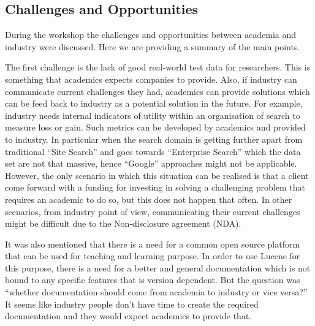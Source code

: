 \subsection{Challenges and Opportunities}


During the workshop the challenges and opportunities between academia and industry were discussed. 
Here we are providing a summary of the main points.


The first challenge is the lack of good real-world test data for researchers. This is something that academics expects companies to provide. 
Also, if industry can communicate current challenges they had, academics can provide solutions which can be feed back to industry as a potential solution in the future. 
For example, industry needs internal indicators of utility within an organisation of search to measure loss or gain. 
Such metrics can be developed by academics and provided to industry. 
In particular when the search domain is getting further apart from traditional ``Site Search'' and goes towards ``Enterprise Search'' which the data set are not that massive, hence ``Google'' approaches might not be applicable. 
However, the only scenario in which this situation can be realised is that a client come forward with a funding for investing in solving a challenging problem that requires an academic to do so, but this does not happen that often. 
In other scenarios, from industry point of view, communicating their current challenges might be difficult due to the Non-disclosure agreement (NDA).


It was also mentioned that there is a need for a common open source platform that can be used for teaching and learning purpose. 
In order to use Lucene for this purpose, there is a need for a better and general documentation which is not bound to any specific features that is version dependent. 
But the question was ``whether documentation should come from academia to industry or vice versa?''
It seems like industry people don't have time to create the required documentation and they would expect academics to provide that. 


